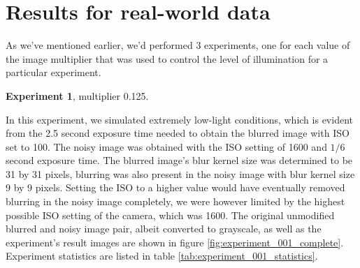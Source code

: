 \documentclass[12pt,notitlepage]{report}
\begin{document}
\clearpage

\section{Results for real-world data}
\label{sec:real_world_data}

As we've mentioned earlier, we'd performed 3 experiments, one for each value of the image multiplier that was used to control the level of illumination for a particular experiment.   

\noindent \textbf{Experiment 1}, multiplier 0.125.

In this experiment, we simulated extremely low-light conditions, which is evident from the 2.5 second exposure time needed to obtain the blurred image with ISO set to 100. The noisy image was obtained with the ISO setting of 1600 and $1/6$ second exposure time. The blurred image's blur kernel size was determined to be 31 by 31 pixels, blurring was also present in the noisy image with blur kernel size 9 by 9 pixels. Setting the ISO to a higher value would have eventually removed blurring in the noisy image completely, we were however limited by the highest possible ISO setting of the camera, which was 1600. The original unmodified blurred and noisy image pair, albeit converted to grayscale, as well as the experiment's result images are shown in figure \ref{fig:experiment_001_complete}. Experiment statistics are listed in table \ref{tab:experiment_001_statistics}. 
\end{document}
